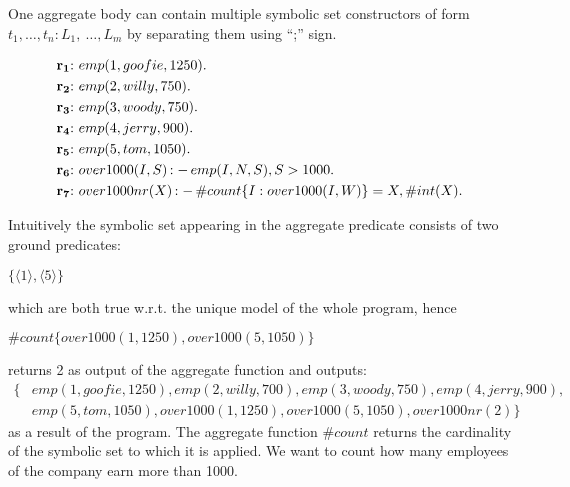 \documentclass[a4paper, titlepage]{article}
\DeclareMathOperator{\leftimpl}{:-}
\newcommand\mycenterline[1]{\par\smallskip\centerline{#1} \smallskip}
\newcommand{\rowprefix}[1]{%
  \ensuremath{\color{black}\mathbf{#1{:}}\ }%
}
\begin{document}
One aggregate body can contain multiple symbolic set constructors 
of form $t_1, \dots, t_n \colon L_1, \ \dots,L_m$ by separating them using ``;'' sign. 
\begin{exmp}
\begin{align*}
\rowprefix{r_1}& emp(1,goofie,1250).\\
\rowprefix{r_2}& emp(2,willy,750).\\
\rowprefix{r_3}& emp(3,woody,750).\\
\rowprefix{r_4}& emp(4,jerry,900).\\
\rowprefix{r_5}& emp(5,tom,1050). \\
\rowprefix{r_6}& over1000(I,S) \leftimpl emp(I,N,S), S > 1000.\\
\rowprefix{r_7}& over1000nr(X) \leftimpl \#count\{I : 
over1000(I,W)\} = X, \#int(X).
\end{align*}
\end{exmp}
Intuitively the symbolic set appearing in the aggregate 
predicate consists of two ground predicates: \\ 
\mycenterline{$\{\langle 1 \rangle,\langle 5 \rangle\}$}
which are both true w.r.t. the unique model of the whole 
program, hence
%
\mycenterline{$ 
\#count\{over1000(1,1250),over1000(5,1050)\}$}
%
returns 2 
as output of the aggregate function and outputs:
\begin{align*}
\{ & \mathit{emp(1,goofie,1250),emp(2,willy,700),emp(3,woody,750),emp(4,jerry,900),}\\
& \mathit{emp(5,tom,1050),over1000(1,1250),over1000(5,1050),over1000nr(2)} \}
\end{align*}
as a result of the program.
The aggregate function $\mathit{\#count}$ returns the 
cardinality of the symbolic set to which it is applied. We 
want to count how many employees of the company earn more 
than 1000. 
\end{document}
